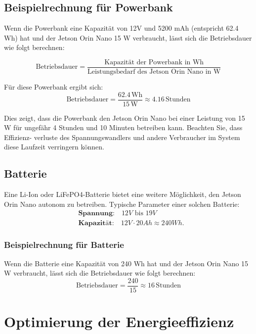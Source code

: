 \documentclass[12pt]{article}
\begin{document}
\subsection{Beispielrechnung für Powerbank}
Wenn die Powerbank eine Kapazität von 12V und 5200 mAh (entspricht 62.4 Wh) hat und der Jetson Orin Nano 15 W verbraucht, lässt sich die Betriebsdauer wie folgt berechnen:

\[
\text{Betriebsdauer} = \frac{\text{Kapazität der Powerbank in Wh}}{\text{Leistungsbedarf des Jetson Orin Nano in W}}
\]

Für diese Powerbank ergibt sich:
\[
\text{Betriebsdauer} = \frac{62.4 \, \text{Wh}}{15 \, \text{W}} \approx 4.16 \, \text{Stunden}
\]

Dies zeigt, dass die Powerbank den Jetson Orin Nano bei einer Leistung von 15 W \indent für ungefähr 4 Stunden und 10 Minuten betreiben kann. Beachten Sie, dass Effizienz- 
\indent verluste des Spannungswandlers und andere Verbraucher im System diese Laufzeit 
\indent verringern können.

\subsection{Batterie}
Eine Li-Ion oder LiFePO4-Batterie bietet eine weitere Möglichkeit, den Jetson Orin Nano autonom zu betreiben. Typische Parameter einer solchen Batterie:
\[
\begin{aligned}
    &\textbf{Spannung:} \quad 12V \text{ bis } 19V \\
    &\textbf{Kapazität:} \quad 12V \cdot 20Ah \approx 240Wh.
\end{aligned}
\]


\subsubsection{Beispielrechnung für Batterie}
Wenn die Batterie eine Kapazität von 240 Wh hat und der Jetson Orin Nano 15 W verbraucht, lässt sich die Betriebsdauer wie folgt berechnen:
\[
\text{Betriebsdauer} = \frac{240}{15} \approx 16 \, \text{Stunden}
\]

\section{Optimierung der Energieeffizienz}
\end{document}
